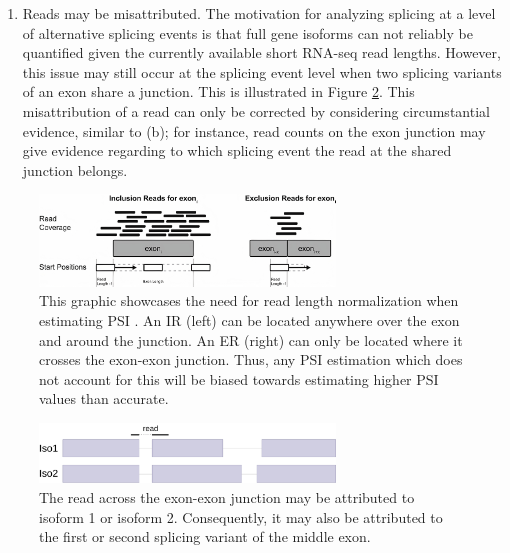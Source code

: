 \begin{enumerate}[label=(\alph*)]
	
	
	\item Reads may be misattributed. The motivation for analyzing splicing at a level of alternative splicing events is that full gene isoforms can not reliably be quantified given the currently available short RNA-seq read lengths. However, this issue may still occur at the splicing event level when two splicing variants of an exon share a junction. This is illustrated in Figure \ref{fig:misattribution}.
	This misattribution of a read can only be corrected by considering circumstantial evidence, similar to (b); for instance, read counts on the exon junction may give evidence regarding to which splicing event the read at the shared junction belongs.
\end{enumerate}


\begin{figure}
	\centering\includegraphics[width=0.7\textwidth]{../visualizations/ch4-methods/read_length_normalization.jpg} 
	\caption{
		This graphic showcases the need for read length normalization when estimating PSI \cite{berlinpsi}. An IR (left) can be located anywhere over the exon and around the junction. An ER (right) can only be located where it crosses the exon-exon junction. Thus, any PSI estimation which does not account for this will be biased towards estimating higher PSI values than accurate. 
}
	\label{fig:readlengthnorm}
\end{figure}

\begin{figure}
	\centering\includegraphics[width=0.7\textwidth]{../visualizations/ch4-methods/visualizations-misattribution.pdf} 
	\caption{The read across the exon-exon junction may be attributed to isoform 1 or isoform 2. Consequently, it may also be attributed to the first or second splicing variant of the middle exon.}
	\label{fig:misattribution}
\end{figure}


